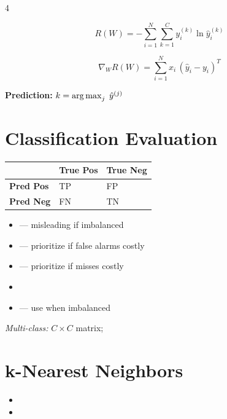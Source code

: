 \documentclass[8pt,a4paper,landscape]{extarticle}
\begin{document}
\begin{multicols*}{4}
\begin{defn}[title=Multi-Class Cross-Entropy]
\[ R(W) = -\sum_{i=1}^{N}\sum_{k=1}^{C} y_i^{(k)}\ln\hat{y}_i^{(k)} \]
\end{defn}

\begin{prop}[title=Gradient]
\[ \nabla_W R(W) = \sum_{i=1}^{N} x_i\,(\hat{y}_i - y_i)^T \]
\end{prop}

\textbf{Prediction:} $k = \operatorname*{arg\,max}_j\; \hat{y}^{(j)}$

\section{Classification Evaluation}

\renewcommand{\arraystretch}{1.1}
\begin{tabularx}{\linewidth}{@{}lXX@{}}
\toprule
 & \textbf{True Pos} & \textbf{True Neg} \\
\midrule
\textbf{Pred Pos} & TP & FP \\
\textbf{Pred Neg} & FN & TN \\
\bottomrule
\end{tabularx}

\begin{itemize}
  \item {} — misleading if imbalanced
  \item {} — prioritize if false alarms costly
  \item {} — prioritize if misses costly
  \item {}
  \item {} — use when imbalanced
\end{itemize}

\textit{Multi-class:} $C\times C$ matrix;
\section{k-Nearest Neighbors}
\begin{itemize}
  \item {}
  \item {}
\end{itemize}


\end{multicols*}
\end{document}
